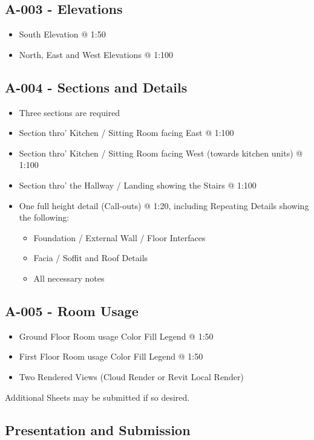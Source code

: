 \subsection*{A-003 - Elevations}
\begin{itemize}
	\item South Elevation @ 1:50
	\item North, East and West Elevations @ 1:100
\end{itemize}

\subsection*{A-004 - Sections and Details}
\begin{itemize}
	\item Three sections are required
	\item Section thro' Kitchen / Sitting Room facing East @ 1:100
	\item Section thro' Kitchen / Sitting Room facing West (towards kitchen units) @ 1:100
	\item Section thro' the Hallway / Landing showing the Stairs @ 1:100
	\item One full height detail (Call-outs) @ 1:20, including Repeating Details showing the following:
	\begin{itemize}
		\item Foundation / External Wall / Floor Interfaces
		\item Facia / Soffit and Roof Details
		\item All necessary notes
	\end{itemize} 
\end{itemize}

\subsection*{A-005 - Room Usage}
\begin{itemize}
	\item Ground Floor Room usage Color Fill Legend @ 1:50
	\item First Floor Room usage Color Fill Legend @ 1:50
	\item Two Rendered Views (Cloud Render or Revit Local Render)
\end{itemize}


Additional Sheets may be submitted if so desired.


\begin{flushleft}
\section*{Presentation and Submission}
\end{flushleft}


